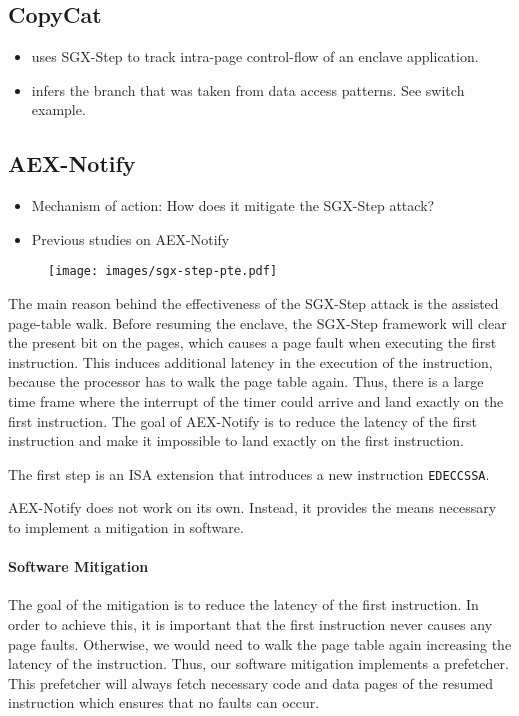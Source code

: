 \documentclass{llncs}
\begin{document}
\subsection{CopyCat}
\begin{itemize}
  \item uses SGX-Step to track intra-page control-flow of an enclave application.
  \item infers the branch that was taken from data access patterns. See switch example.
\end{itemize}

\subsection{AEX-Notify}
\begin{itemize}
  \item Mechanism of action: How does it mitigate the SGX-Step attack?
  \item Previous studies on AEX-Notify
\end{itemize}

\begin{figure}[t]
  \centering
  \texttt{[image: images/sgx-step-pte.pdf]}
  \caption{}
  \label{fig:sgx-step-pte}
\end{figure}

The main reason behind the effectiveness of the SGX-Step attack is the assisted
page-table walk.
Before resuming the enclave, the SGX-Step framework will clear the present bit
on the pages, which causes a page fault when executing the first instruction.
This induces additional latency in the execution of the instruction, because
the processor has to walk the page table again.
Thus, there is a large time frame where the interrupt of the timer could
arrive and land exactly on the first instruction.
The goal of AEX-Notify is to reduce the latency of the first instruction
and make it impossible to land exactly on the first instruction.

The first step is an ISA extension that introduces a new instruction \texttt{EDECCSSA}.

AEX-Notify does not work on its own.
Instead, it provides the means necessary to implement a mitigation in software.

\paragraph{Software Mitigation}
The goal of the mitigation is to reduce the latency of the first instruction.
In order to achieve this, it is important that the first instruction never causes any page faults.
Otherwise, we would need to walk the page table again increasing the latency of the instruction.
Thus, our software mitigation implements a prefetcher.
This prefetcher will always fetch necessary code and data pages of the resumed
instruction which ensures that no faults can occur.
\end{document}
